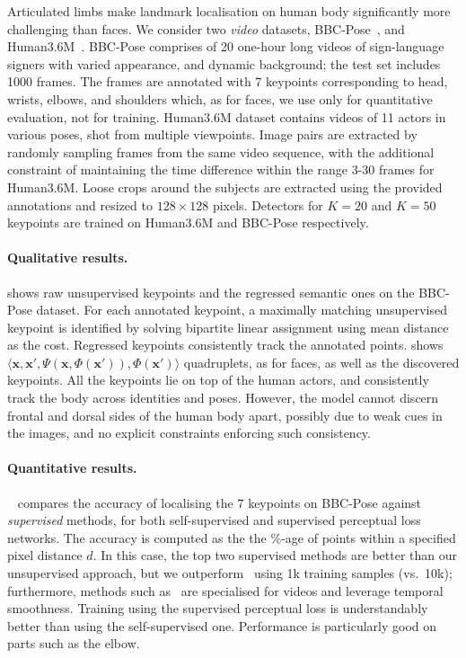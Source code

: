 \documentclass{article}
\newcommand{\bx}{\mathbf{x}}
\begin{document}
Articulated limbs make landmark localisation on human body significantly more challenging than faces. We consider two \emph{video} datasets, BBC-Pose~\cite{Charles13}, and Human3.6M~\citep{h36m_pami}. BBC-Pose comprises of 20 one-hour long videos of sign-language signers with varied appearance, and dynamic background;
the test set includes 1000 frames. The frames are annotated with 7 keypoints corresponding to head, wrists, elbows, and shoulders which, as for faces, we use only for quantitative evaluation, not for training. Human3.6M dataset contains videos of 11 actors in various poses, shot from multiple viewpoints.
Image pairs are extracted by randomly sampling frames from the same video sequence, with the additional constraint of maintaining the time difference within the range 3-30 frames for Human3.6M. Loose crops around the subjects are extracted using the provided annotations and resized to $128{\times}128$ pixels.
Detectors for $K=20$ and $K=50$ keypoints are trained on Human3.6M and BBC-Pose respectively.


\paragraph{Qualitative results.} shows raw unsupervised keypoints and the regressed semantic ones on the BBC-Pose dataset. For each annotated keypoint, a maximally matching unsupervised keypoint is identified by solving bipartite linear assignment using mean distance as the cost. Regressed keypoints consistently track the annotated points.  shows $\langle\bx,\bx',\Psi\left(\bx,\Phi(\bx')\right),\Phi(\bx')\rangle$ quadruplets, as for faces, as well as the discovered keypoints. All the keypoints lie on top of the human actors, and consistently track the body across identities and poses. However, the model cannot discern frontal and dorsal sides of the human body apart, possibly due to weak cues in the images, and no explicit constraints enforcing such consistency.
\paragraph{Quantitative results.}~ compares the accuracy of localising the 7 keypoints on BBC-Pose against \emph{supervised} methods, for both self-supervised and supervised perceptual loss networks. The accuracy is computed as the the $\%$-age of points within a specified pixel distance $d$. In this case, the top two supervised methods are better than our unsupervised approach, but we outperform~\cite{Pfister13,Yang11} using 1k training samples (vs.~10k); furthermore, methods such as~\cite{Pfister15a} are specialised for videos and leverage temporal smoothness. Training using the supervised perceptual loss is understandably better than using the self-supervised one. Performance is particularly good on parts such as the elbow.
\end{document}
